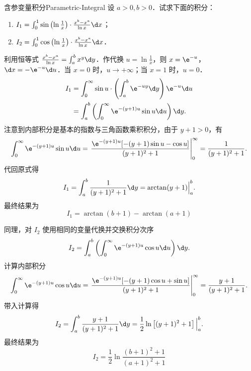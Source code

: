 \begin{problem}{含参变量积分}{Parametric-Integral}
    设 $a > 0, b > 0$．试求下面的积分：
    \begin{enumerate}
        \item $I_1 = \int_0^1 \sin \left( \ln \frac{1}{x} \right) \cdot \frac{x^b - x^a}{\ln x} \d x$；
        \item $I_2 = \int_0^1 \cos \left( \ln \frac{1}{x} \right) \cdot \frac{x^b - x^a}{\ln x} \d x$．
    \end{enumerate}
\end{problem}

\begin{solution}
    利用恒等式 $\frac{x^b - x^a}{\ln x} = \int_a^b x^y \d y$．作代换 $u = \ln \frac{1}{x}$，则 $x = \e^{-u}$，$\d x = -\e^{-u} \d u$．当 $x = 0$ 时，$u \to +\infty$；当 $x = 1$ 时，$u = 0$．
    \begin{equation}
        \begin{aligned}
            I_1 & = \int_0^\infty \sin u \cdot \left( \int_a^b \e^{-uy} \d y \right) \e^{-u} \d u \\
                & = \int_a^b \left( \int_0^\infty \e^{-(y+1)u} \sin u \d u \right) \d y.
        \end{aligned}
    \end{equation}
    注意到内部积分是基本的指数与三角函数乘积积分，由于 $y+1 > 0$，有
    \begin{equation}
        \int_0^\infty \e^{-(y+1)u} \sin u \d u = \left. \frac{\e^{-(y+1)u} [-(y+1) \sin u - \cos u]}{(y+1)^2 + 1} \right|_0^\infty = \frac{1}{(y+1)^2 + 1}.
    \end{equation}
    代回原式得
    \begin{equation}
        I_1 = \int_a^b \frac{1}{(y+1)^2 + 1} \d y = \arctan(y+1) \Big|_a^b.
    \end{equation}
    最终结果为
    \begin{equation}
        \boxed{I_1 = \arctan(b+1) - \arctan(a+1)}
    \end{equation}

    同理，对 $I_2$ 使用相同的变量代换并交换积分次序
    \begin{equation}
        I_2 = \int_a^b \left( \int_0^\infty \e^{-(y+1)u} \cos u \d u \right) \d y.
    \end{equation}
    计算内部积分
    \begin{equation}
        \int_0^\infty \e^{-(y+1)u} \cos u \d u = \left. \frac{\e^{-(y+1)u} [-(y+1) \cos u + \sin u]}{(y+1)^2 + 1} \right|_0^\infty = \frac{y+1}{(y+1)^2 + 1}.
    \end{equation}
    带入计算得
    \begin{equation}
        I_2 = \int_a^b \frac{y+1}{(y+1)^2 + 1} \d y = \frac{1}{2} \ln \left[ (y+1)^2 + 1 \right] \Big|_a^b.
    \end{equation}
    最终结果为
    \begin{equation}
        \boxed{I_2 = \frac{1}{2} \ln \frac{(b+1)^2 + 1}{(a+1)^2 + 1}}
    \end{equation}
\end{solution}

